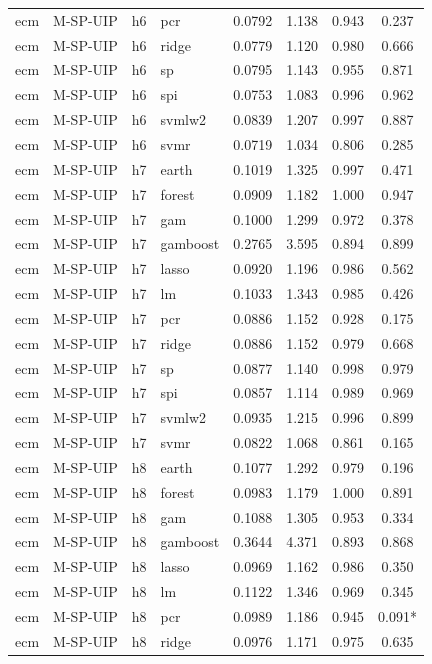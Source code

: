 \begin{ThreePartTable}
\begin{longtable}[t]{llclcccc}
ecm & M-SP-UIP & h6 & pcr & 0.0792 & 1.138 & 0.943 & 0.237\\
ecm & M-SP-UIP & h6 & ridge & 0.0779 & 1.120 & 0.980 & 0.666\\
ecm & M-SP-UIP & h6 & sp & 0.0795 & 1.143 & 0.955 & 0.871\\
ecm & M-SP-UIP & h6 & spi & 0.0753 & 1.083 & 0.996 & 0.962\\
ecm & M-SP-UIP & h6 & svmlw2 & 0.0839 & 1.207 & 0.997 & 0.887\\
ecm & M-SP-UIP & h6 & svmr & 0.0719 & 1.034 & 0.806 & 0.285\\
\addlinespace
ecm & M-SP-UIP & h7 & earth & 0.1019 & 1.325 & 0.997 & 0.471\\
ecm & M-SP-UIP & h7 & forest & 0.0909 & 1.182 & 1.000 & 0.947\\
ecm & M-SP-UIP & h7 & gam & 0.1000 & 1.299 & 0.972 & 0.378\\
ecm & M-SP-UIP & h7 & gamboost & 0.2765 & 3.595 & 0.894 & 0.899\\
ecm & M-SP-UIP & h7 & lasso & 0.0920 & 1.196 & 0.986 & 0.562\\
ecm & M-SP-UIP & h7 & lm & 0.1033 & 1.343 & 0.985 & 0.426\\
ecm & M-SP-UIP & h7 & pcr & 0.0886 & 1.152 & 0.928 & 0.175\\
ecm & M-SP-UIP & h7 & ridge & 0.0886 & 1.152 & 0.979 & 0.668\\
ecm & M-SP-UIP & h7 & sp & 0.0877 & 1.140 & 0.998 & 0.979\\
ecm & M-SP-UIP & h7 & spi & 0.0857 & 1.114 & 0.989 & 0.969\\
ecm & M-SP-UIP & h7 & svmlw2 & 0.0935 & 1.215 & 0.996 & 0.899\\
ecm & M-SP-UIP & h7 & svmr & 0.0822 & 1.068 & 0.861 & 0.165\\
\addlinespace
ecm & M-SP-UIP & h8 & earth & 0.1077 & 1.292 & 0.979 & 0.196\\
ecm & M-SP-UIP & h8 & forest & 0.0983 & 1.179 & 1.000 & 0.891\\
ecm & M-SP-UIP & h8 & gam & 0.1088 & 1.305 & 0.953 & 0.334\\
ecm & M-SP-UIP & h8 & gamboost & 0.3644 & 4.371 & 0.893 & 0.868\\
ecm & M-SP-UIP & h8 & lasso & 0.0969 & 1.162 & 0.986 & 0.350\\
ecm & M-SP-UIP & h8 & lm & 0.1122 & 1.346 & 0.969 & 0.345\\
ecm & M-SP-UIP & h8 & pcr & 0.0989 & 1.186 & 0.945 & 0.091*\\
ecm & M-SP-UIP & h8 & ridge & 0.0976 & 1.171 & 0.975 & 0.635\\

\end{longtable}
\end{ThreePartTable}
